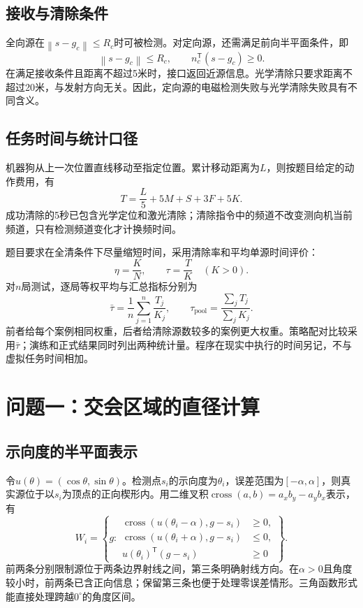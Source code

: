 \documentclass[UTF8,fontset=fandol,a4paper,zihao=-4]{ctexart}
\newcommand{\norm}[1]{\left\lVert#1\right\rVert}
\newcommand{\cross}[2]{\operatorname{cross}(#1,#2)}
\begin{document}
\subsection{接收与清除条件}
全向源在$\norm{s-g_c}\le R_c$时可被检测。对定向源，还需满足前向半平面条件，即
\begin{equation}\label{eq:visibility}
\norm{s-g_c}\le R_c,\qquad n_c^{\mathsf T}(s-g_c)\ge0.
\end{equation}
在满足接收条件且距离不超过5米时，接口返回近源信息。光学清除只要求距离不超过20米，与发射方向无关。因此，定向源的电磁检测失败与光学清除失败具有不同含义。

\subsection{任务时间与统计口径}
机器狗从上一次位置直线移动至指定位置。累计移动距离为$L$，则按题目给定的动作费用，有
\begin{equation}\label{eq:time}
T=\frac L5+5M+S+3F+5K.
\end{equation}
成功清除的5秒已包含光学定位和激光清除；清除指令中的频道不改变测向机当前频道，只有检测频道变化才计换频时间。

题目要求在全清条件下尽量缩短时间，采用清除率和平均单源时间评价：
\begin{equation}
\eta=\frac KN,\qquad \tau=\frac TK\quad(K>0).
\end{equation}
对$n$局测试，逐局等权平均与汇总指标分别为
\begin{equation}\label{eq:averages}
\bar\tau=\frac1n\sum_{j=1}^n\frac{T_j}{K_j},\qquad
\tau_{\mathrm{pool}}=\frac{\sum_jT_j}{\sum_jK_j}.
\end{equation}
前者给每个案例相同权重，后者给清除源数较多的案例更大权重。策略配对比较采用$\bar\tau$；演练和正式结果同时列出两种统计量。程序在现实中执行的时间另记，不与虚拟任务时间相加。

\section{问题一：交会区域的直径计算}
\subsection{示向度的半平面表示}
令$u(\theta)=(\cos\theta,\sin\theta)$。检测点$s_i$的示向度为$\theta_i$，误差范围为$[-\alpha,\alpha]$，则真实源位于以$s_i$为顶点的正向楔形内。用二维叉积$\cross ab=a_xb_y-a_yb_x$表示，有
\begin{equation}\label{eq:wedge}
W_i=\left\{g:\begin{aligned}
\cross{u(\theta_i-\alpha)}{g-s_i}&\ge0,\\
\cross{u(\theta_i+\alpha)}{g-s_i}&\le0,\\
u(\theta_i)^{\mathsf T}(g-s_i)&\ge0
\end{aligned}\right\}.
\end{equation}
前两条分别限制源位于两条边界射线之间，第三条明确射线方向。在$\alpha>0$且角度较小时，前两条已含正向信息；保留第三条也便于处理零误差情形。三角函数形式能直接处理跨越$0^\circ$的角度区间。
\end{document}
